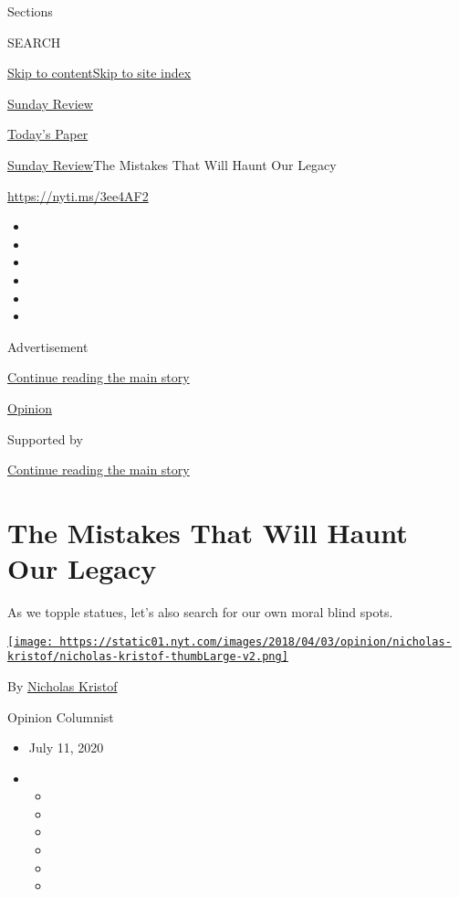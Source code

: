 Sections

SEARCH

\protect\hyperlink{site-content}{Skip to
content}\protect\hyperlink{site-index}{Skip to site index}

\href{https://www.nytimes.com/section/opinion/sunday}{Sunday Review}

\href{https://myaccount.nytimes.com/auth/login?response_type=cookie\&client_id=vi}{}

\href{https://www.nytimes.com/section/todayspaper}{Today's Paper}

\href{/section/opinion/sunday}{Sunday Review}\textbar{}The Mistakes That
Will Haunt Our Legacy

\href{https://nyti.ms/3ee4AF2}{https://nyti.ms/3ee4AF2}

\begin{itemize}
\item
\item
\item
\item
\item
\item
\end{itemize}

Advertisement

\protect\hyperlink{after-top}{Continue reading the main story}

\href{/section/opinion}{Opinion}

Supported by

\protect\hyperlink{after-sponsor}{Continue reading the main story}

\hypertarget{the-mistakes-that-will-haunt-our-legacy}{%
\section{The Mistakes That Will Haunt Our
Legacy}\label{the-mistakes-that-will-haunt-our-legacy}}

As we topple statues, let's also search for our own moral blind spots.

\href{https://www.nytimes.com/column/nicholas-kristof}{\texttt{[image: https://static01.nyt.com/images/2018/04/03/opinion/nicholas-kristof/nicholas-kristof-thumbLarge-v2.png]}}

By \href{https://www.nytimes.com/column/nicholas-kristof}{Nicholas
Kristof}

Opinion Columnist

\begin{itemize}
\item
  July 11, 2020
\item
  \begin{itemize}
  \item
  \item
  \item
  \item
  \item
  \item
  \end{itemize}
\end{itemize}

